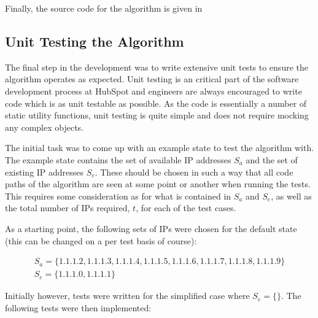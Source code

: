Finally, the source code for the algorithm is given in 

\subsection{Unit Testing the Algorithm}
The final step in the development was to write extensive unit tests to ensure the algorithm operates as expected. Unit testing is an critical part of the software development process at HubSpot and engineers are always encouraged to write code which is as unit testable as possible. As the code is essentially a number of static utility functions, unit testing is quite simple and does not require mocking any complex objects.  

The initial task was to come up with an example state to test the algorithm with. The example state contains the set of available IP addresses $S_a$ and the set of existing IP addresses $S_e$. These should be chosen in such a way that all code paths of the algorithm are seen at some point or another when running the tests. This requires some consideration as for what is contained in $S_a$ and $S_e$, as well as the total number of IPs required, $t$, for each of the test cases.

As a starting point, the following sets of IPs were chosen for the default state (this can be changed on a per test basis of course):

\begin{equation}\label{eq:initialState}
\begin{gathered}
S_a = \{1.1.1.2, 1.1.1.3, 1.1.1.4, 1.1.1.5, 1.1.1.6, 1.1.1.7, 1.1.1.8, 1.1.1.9\} \\
S_e = \{1.1.1.0, 1.1.1.1\}
\end{gathered}
\end{equation}

Initially however, tests were written for the simplified case where $S_e = \{\}$. The following tests were then implemented:

